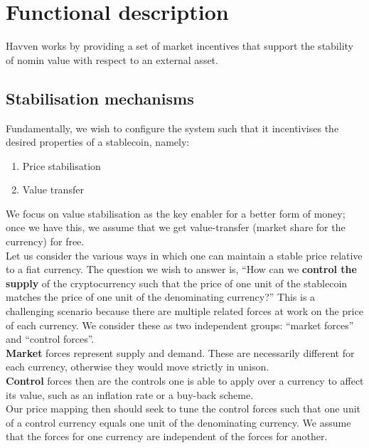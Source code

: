 \section{Functional description}

Havven works by providing a set of market incentives that support the stability of nomin value with respect to an external asset.

\subsection{Stabilisation mechanisms}

Fundamentally, we wish to configure the system such that it incentivises the desired properties of a stablecoin, namely:
\begin{enumerate}
    \item Price stabilisation
    \item Value transfer
\end{enumerate}

\noindent We focus on value stabilisation as the key enabler for a better form of money; once we have this, we assume that we get value-transfer (market share for the currency) for free. \\

\noindent Let us consider the various ways in which one can maintain a stable price relative to a fiat currency. The question we wish to answer is, ``How can we \textbf{control the supply} of the cryptocurrency such that the price of one unit of the stablecoin matches the price of one unit of the denominating currency?'' This is a challenging scenario because there are multiple related forces at work on the price of each currency. We consider these as two independent groups: ``market forces'' and ``control forces''. \\

\noindent \textbf{Market} forces represent supply and demand. These are necessarily different for each currency, otherwise they would move strictly in unison. \\

\noindent \textbf{Control} forces then are the controls one is able to apply over a currency to affect its value, such as an inflation rate or a buy-back scheme. \\

\noindent Our price mapping then should seek to tune the control forces such that one unit of a control currency equals one unit of the denominating currency. We assume that the forces for one currency are independent of the forces for another. \\

